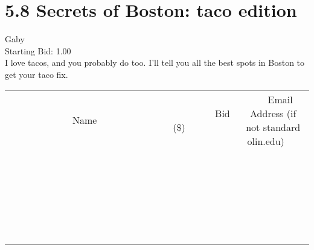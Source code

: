 \documentclass[11pt]{article}
\begin{document}
					\section*{5.8 Secrets of Boston: taco edition}
					Gaby \\
					Starting Bid: 1.00 \\
					I love tacos, and you probably do too. I'll tell you all the best spots in Boston to get your taco fix. \\
					[6ex]
					\begin{tabular}{c c c}
						~~~~~~~~~~~~~Name~~~~~~~~~~~~~ & ~~~~~~~~~Bid (\$)~~~~~~~~~ & ~~~Email Address (if not standard olin.edu)~~~ \\
				
 & & \\
\hline
 & & \\
\hline
 & & \\
\hline
 & & \\
\hline
 & & \\
\hline
 & & \\
\hline
 & & \\
\hline
 & & \\
\hline
 & & \\
\hline
 & & \\
\hline
 & & \\
\hline
 & & \\
\hline
 & & \\
\hline
 & & \\
\hline
 & & \\
\hline
 & & \\
\hline
 & & \\
\hline
 & & \\
\hline
 & & \\
\hline
 & & \\
\hline
 & & \\
\hline
 & & \\
\hline
 & & \\
\hline
 & & \\
\hline
 & & \\
\hline
 & & \\
\hline
					\end{tabular}
					\clearpage
				
\end{document}
